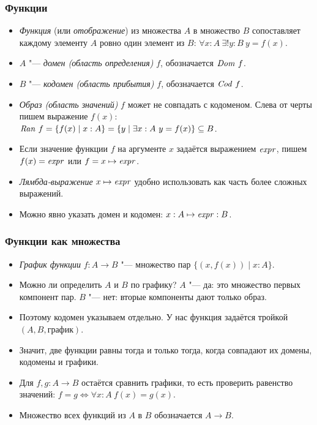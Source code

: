 \documentclass[10pt]{beamer}
\begin{document}
\begin{frame}
    \frametitle{Функции}
    \begin{itemize}
        \item \emph{Функция} (или \emph{отображение}) из множества $A$ в множество $B$ сопоставляет каждому элементу $A$ ровно один элемент из $B$:
        $\forall x : A ~ \exists ! y : B ~ y=f(x)$.
        \item $A$ "--- \emph{домен (область определения)} $f$, обозначается $\mathit{Dom}\ f$.
        \item $B$ "--- \emph{кодомен (область прибытия)} $f$, обозначается $\mathit{Cod}\ f$.
        \item \emph{Образ (область значений)} $f$ может не совпадать с кодоменом. Слева от черты пишем выражение $f(x)$:
        $\mathit{Ran}\ f=\{f(x)\mid x:A\}=\{y\mid\exists x:A~y=f(x)\}\subseteq B$.
        \pause
        \item Если значение функции $f$ на аргументе $x$ задаётся выражением $\mathit{expr}$, пишем $f(x) = \mathit{expr}$ или $f = x \mapsto \mathit{expr}$. 
        \item \emph{Лямбда-выражение} $x \mapsto \mathit{expr}$ удобно использовать как часть более сложных выражений.
        \item Можно явно указать домен и кодомен: $x:A\mapsto\mathit{expr}:B$.
    \end{itemize}
\end{frame}

\begin{frame}
    \frametitle{Функции как множества}
    \begin{itemize}
        \item \emph{График функции} $f:A\to B$ "--- множество пар $\{(x, f(x)) \mid x : A\}$.
        \item Можно ли определить $A$ и $B$ по графику? \pause $A$ "--- да: это множество первых компонент пар. \pause $B$ "--- нет: вторые компоненты дают только образ.
        \pause
        \item Поэтому кодомен указываем отдельно. У нас функция задаётся тройкой $(A,B,\text{график})$.
        \item Значит, две функции равны тогда и только тогда, когда совпадают их домены, кодомены и графики.
        \item Для $f,g:A\to B$ остаётся сравнить графики, то есть проверить равенство значений: $f=g\iff \forall x:A~f(x)=g(x)$.
        \item Множество всех функций из $A$ в $B$ обозначается $A \to B$.
    \end{itemize}
\end{frame}
\end{document}
